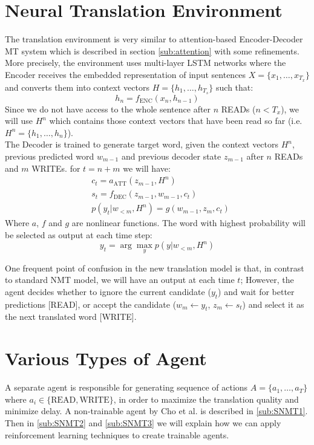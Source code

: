 \documentclass{sfuthesis}
\begin{document}
\section{Neural Translation Environment} \label{sec:NTE}
The translation environment is very similar to attention-based Encoder-Decoder MT system which is described in section \ref{sub:attention} with some refinements. More precisely, the environment uses multi-layer LSTM networks where the Encoder receives the embedded representation of input sentences $X=\{x_1, \dots, x_{T_x}\}$ and converts them into context vectors $H=\{ h_1, \dots, h_{T_s} \}$ such that:
$$ h_n = f_{\textrm{ENC}}(x_n, h_{n-1}) $$
Since we do not have access to the whole sentence after $n$ READs ($n < T_x$), we will use $H^n$ which contains those context vectors that have been read so far (i.e. $H^n = \{ h_1, \dots, h_{n} \}$).\\
The Decoder is trained to generate target word, given the context vectors $H^n$, previous predicted word $w_{m-1}$ and previous decoder state $z_{m-1}$ after $n$ READs and $m$ WRITEs. for $t = n + m$ we will have:
\begin{align*}
    &c_{t} = a_{\textrm{ATT}}(z_{m-1}, H^n)\\
    &s_{t} = f_{\textrm{DEC}}(z_{m-1}, w_{m-1}, c_t)\\
    &p(y_t|w_{<{m}}, H^n) = g(w_{m-1}, z_m, c_t)
\end{align*}
Where $a$, $f$ and $g$ are nonlinear functions. The word with highest probability will be selected as output at each time step:
$$y_t = \arg \max_y p(y|w_{<m}, H^n)$$

One frequent point of confusion in the new translation model is that, in contrast to standard NMT model, we will have an output at each time $t$; However, the agent decides whether to ignore the current candidate ($y_t$) and wait for better predictions [READ], or accept the candidate ($w_m \leftarrow y_t$, $z_m \leftarrow s_t$) and select it as the next
translated word [WRITE].

\section{Various Types of Agent} \label{sec:Agent}
A separate agent is responsible for generating sequence of actions $A = \{ a_1, \dots, a_T \}$ where $a_i \in \{ \text{READ}, \text{WRITE} \}$, in order to maximize the translation quality and minimize delay. A non-trainable agent by Cho et al. \cite{cho:2016:Arxive} is described in \ref{sub:SNMT1}. Then in \ref{sub:SNMT2} and \ref{sub:SNMT3} we will explain how we can apply reinforcement learning techniques to create trainable agents.
\end{document}
